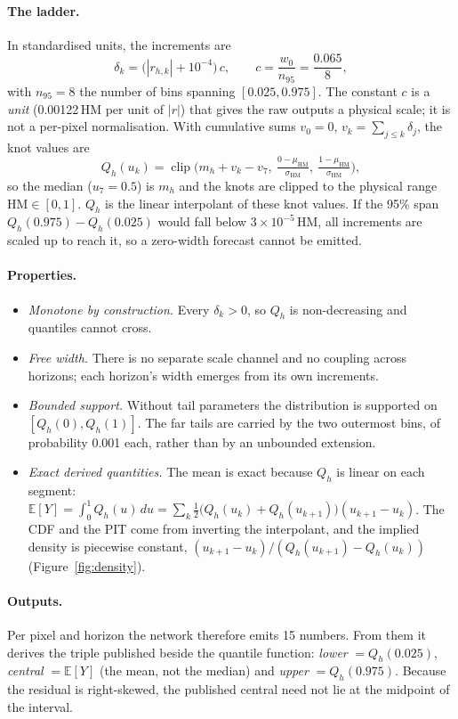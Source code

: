 \documentclass[11pt,a4paper]{article}
\newcommand{\HM}{\mathrm{HM}}
\newcommand{\E}{\mathbb{E}}
\begin{document}
\paragraph{The ladder.} In standardised units, the increments are
\[
\delta_k = \big(|r_{h,k}| + 10^{-4}\big)\, c, \qquad c = \frac{w_0}{n_{95}} = \frac{0.065}{8},
\]
with $n_{95}=8$ the number of bins spanning $[0.025,0.975]$. The constant $c$ is a \emph{unit}
(0.00122\,HM per unit of $|r|$) that gives the raw outputs a physical scale; it is not a
per-pixel normalisation. With cumulative sums
$v_0=0$, $v_k=\sum_{j\le k}\delta_j$, the knot values are
\[
Q_h(u_k) = \operatorname{clip}\!\Big(m_h + v_k - v_7,\ \tfrac{0-\mu_{\HM}}{\sigma_{\HM}},\
\tfrac{1-\mu_{\HM}}{\sigma_{\HM}}\Big),
\]
so the median ($u_7=0.5$) is $m_h$ and the knots are clipped to the physical range
$\HM\in[0,1]$. $Q_h$ is the linear interpolant of these knot values. If the 95\% span
$Q_h(0.975)-Q_h(0.025)$ would fall below $3\times10^{-5}$\,HM, all increments are scaled up to
reach it, so a zero-width forecast cannot be emitted.

\paragraph{Properties.}
\begin{itemize}
\item \emph{Monotone by construction.} Every $\delta_k>0$, so $Q_h$ is non-decreasing and
  quantiles cannot cross.
\item \emph{Free width.} There is no separate scale channel and no coupling across horizons; each
  horizon's width emerges from its own increments.
\item \emph{Bounded support.} Without tail parameters the distribution is supported on
  $[Q_h(0),Q_h(1)]$. The far tails are carried by the two outermost bins, of probability 0.001
  each, rather than by an unbounded extension.
\item \emph{Exact derived quantities.} The mean is exact because $Q_h$ is linear on each segment:
  $\E[Y]=\int_0^1 Q_h(u)\,du = \sum_k \tfrac12\big(Q_h(u_k)+Q_h(u_{k+1})\big)(u_{k+1}-u_k)$. The
  CDF and the PIT come from inverting the interpolant, and the implied density is
  piecewise constant, $(u_{k+1}-u_k)/(Q_h(u_{k+1})-Q_h(u_k))$ (Figure~\ref{fig:density}).
\end{itemize}

\paragraph{Outputs.} Per pixel and horizon the network therefore emits 15 numbers. From them it
derives the triple published beside the quantile function: \emph{lower} $=Q_h(0.025)$,
\emph{central} $=\E[Y]$ (the mean, not the median) and \emph{upper} $=Q_h(0.975)$. Because the
residual is right-skewed, the published central need not lie at the midpoint of the interval.
\end{document}
